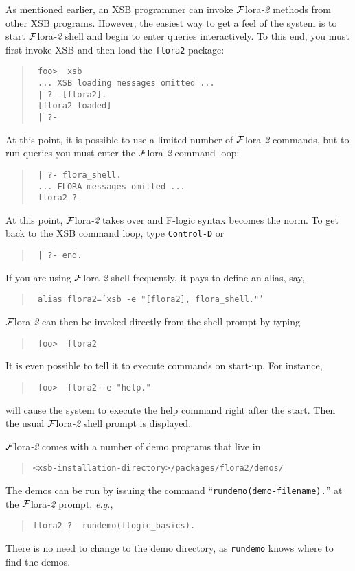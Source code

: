 \documentclass[11pt]{article}
\newcommand{\FLORA}{{\mbox{${\cal F}${\sc lora}\rm\emph{-2}}}\xspace}
\newcommand{\fl}{\mbox{F-logic}\xspace}
\begin{document}
As mentioned earlier, an XSB programmer can invoke \FLORA methods from
other XSB programs. However, the easiest way to get a feel of the system
is to start \FLORA shell and begin to enter queries interactively.  To
this end, you must first invoke XSB and then load the {\tt flora2}
package:
\begin{quote}
  \tt
foo>~~xsb  \\
\tt
... XSB loading messages omitted ...\\
\tt
| ?- [flora2].\\
\tt
[flora2 loaded]\\
\tt
| ?-
\end{quote}
At this point, it is possible to use a limited number of \FLORA
commands, but to run queries you must enter the \FLORA command loop:
\begin{quote}
  \tt
| ?- flora\_shell.  \\
 \tt
... FLORA messages omitted ... \\
 \tt
flora2 ?-
\end{quote}

At this point, \FLORA takes over and \fl syntax becomes the
norm. To get back to the XSB command loop, type {\tt Control-D} or 
\begin{quote}
  \tt
| ?- end.  
\end{quote}

If you are using \FLORA shell frequently, it pays to define an alias, say,
\begin{quote}
 {\tt
   alias flora2='xsb -e "[flora2], flora\_shell."'
   }
\end{quote}
\FLORA can then be invoked directly from the shell prompt by typing
\begin{quote}
  \tt
foo>~~flora2
\end{quote}
It is even possible to tell it to execute commands on start-up.
For instance, 
\begin{quote}
 \tt
 foo>~~flora2 -e "help."
\end{quote}
will cause the system to execute the help command right after the start.
Then the usual \FLORA shell prompt is displayed.

\noindent
\FLORA comes with a number of demo programs that live in
\begin{quote}
 \verb|<xsb-installation-directory>/packages/flora2/demos/|  
\end{quote}
The demos can be run by issuing the command
``\verb|rundemo(demo-filename).|''
at the \FLORA prompt, {\it e.g.},
\begin{quote}
 \verb|flora2 ?- rundemo(flogic_basics).|
\end{quote}
There is no need to change to the demo directory, as {\tt rundemo} knows
where to find the demos.
\end{document}

